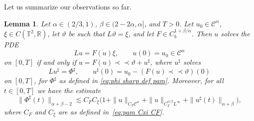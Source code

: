 \documentclass[11pt,a4paper]{article}
\newcommand{\mathD}{\mathrm{D}}
\newcommand{\precprec}{\prec\!\!\!\prec}
\newtheorem{lemma}[theorem]{Lemma}
\theoremstyle{remark}
\newcommand{\R}{\mathbb{R}}
\newcommand{\CC}{\ensuremath{\mathscr{C}}}
\begin{document}


Let us summarize our observations so far.

\begin{lemma}
  Let $\alpha \in (2/3, 1)$, $\beta \in (2-2\alpha, \alpha]$, and $T>0$. Let $u_0 \in \CC^\alpha$, $\xi \in C(\mathbb{T}^2,\R)$, let $\vartheta$ be such that $L \vartheta = \xi$, and let $F \in C^{1+\beta/\alpha}_{b}$. Then
  $u$ solves the PDE
  \[
     L u=F ( u ) \xi , \hspace{2em} u ( 0 ) =u_{0} \in \CC^\alpha
  \]
  on $[ 0,T ]$ if and only if $u=F ( u ) \precprec \vartheta +u^{\sharp}$,
  where $u^{\sharp}$ solves
  \[
     L u^{\sharp} = \Phi^{\sharp} , \hspace{2em} u^{\sharp} ( 0 ) =u_{0} - ( F ( u ) \precprec \vartheta ) ( 0 )
  \]
  on $[ 0,T ]$, for $\Phi^{\sharp}$ as defined in {\eqref{eq:phi sharp def pam}}. Moreover, for all $t \in [ 0,T ]$ we have the estimate
  \begin{equation}\label{eq:phi sharp estimate pam}
     \| \Phi^{\sharp} ( t ) \|_{\alpha +\beta - 2} \lesssim C_F C_\xi \big( 1 + \|u\|_{C_T\CC^\alpha} + \|u\|_{C^{\alpha/2}_TL^\infty} + \|u^\sharp (t)\|_{\alpha+\beta} \big),
  \end{equation}
  where $C_F$ and $C_\xi$ are as defined in~\eqref{eq:pam Cxi CF}.
\end{lemma}
\end{document}
